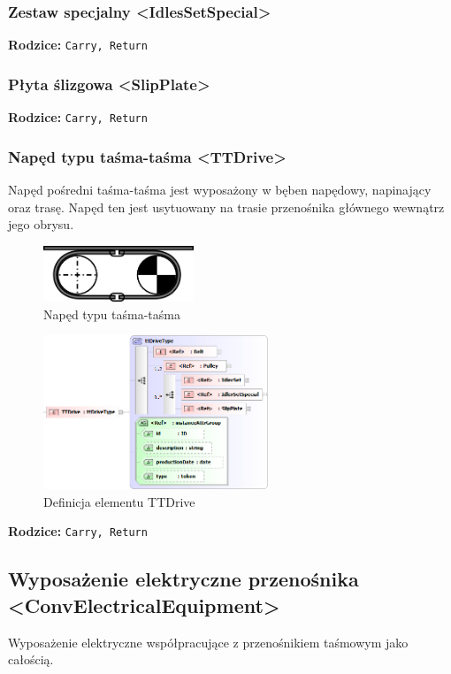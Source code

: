\documentclass[12pt,a4paper]{article}
\begin{document}
\subsubsection{Zestaw specjalny <IdlesSetSpecial>}
\noindent\textbf{Rodzice:} \texttt{Carry, Return}

\subsubsection{Płyta ślizgowa <SlipPlate>}
\noindent\textbf{Rodzice:} \texttt{Carry, Return}

\subsubsection{Napęd typu taśma-taśma <TTDrive>}
Napęd pośredni taśma-taśma jest wyposażony w bęben napędowy, napinający oraz
trasę.  Napęd ten jest usytuowany na trasie przenośnika głównego wewnątrz jego
obrysu.

\begin{figure}[H]
  \centering
  \includegraphics[width=0.4\textwidth]{png/naped_tt}
  \caption{Napęd typu taśma-taśma}
  \label{fig:ttDrive-drw}
\end{figure}

\begin{figure}[H]
  \centering
  \includegraphics[width=0.6\textwidth]{png/liquid/TTDrive}
  \caption{Definicja elementu TTDrive}
  \label{fig:ttDrive-xsd}
\end{figure}

\noindent\textbf{Rodzice:} \texttt{Carry, Return}


\subsection{Wyposażenie elektryczne przenośnika <ConvElectricalEquipment>}
Wyposażenie elektryczne współpracujące z przenośnikiem taśmowym jako całością.
\end{document}
